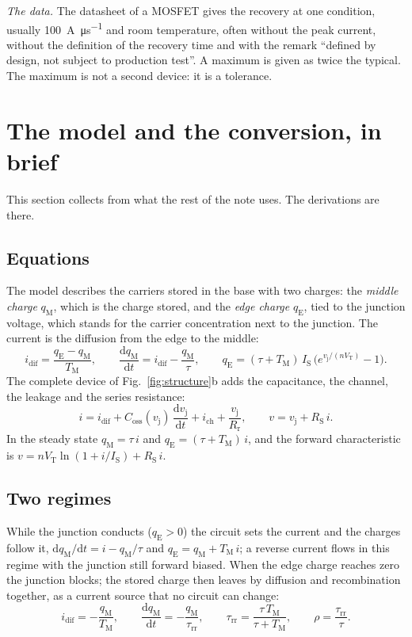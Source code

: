 \documentclass[10pt,a4paper]{scrartcl}
\newcommand{\Coss}{C_\mathrm{oss}}
\newcommand{\taurr}{\tau_\mathrm{rr}}
\newcommand{\TM}{T_\mathrm{M}}
\newcommand{\qE}{q_\mathrm{E}}
\newcommand{\qM}{q_\mathrm{M}}
\newcommand{\idif}{i_\mathrm{dif}}
\newcommand{\ich}{i_\mathrm{ch}}
\newcommand{\vj}{v_\mathrm{j}}
\newcommand{\IS}{I_\mathrm{S}}
\newcommand{\RS}{R_\mathrm{S}}
\newcommand{\Rr}{R_\mathrm{r}}
\newcommand{\VT}{V_\mathrm{T}}
\newcommand{\diff}{\mathrm{d}}
\begin{document}
\emph{The data.} The datasheet of a MOSFET gives the recovery at one condition, usually \SI{100}{\ampere\per\micro\second} and room temperature, often without the peak current, without the definition of the recovery time and with the remark ``defined by design, not subject to production test''. A maximum is given as twice the typical. The maximum is not a second device: it is a tolerance.

\section{The model and the conversion, in brief}
\label{sec:model}
This section collects from \cite{lmnote} what the rest of the note uses. The derivations are there.

\subsection{Equations}
The model describes the carriers stored in the base with two charges: the \emph{middle charge} $\qM$, which is the charge stored, and the \emph{edge charge} $\qE$, tied to the junction voltage, which stands for the carrier concentration next to the junction. The current is the diffusion from the edge to the middle:
\begin{equation}
\idif = \frac{\qE - \qM}{\TM} , \qquad
\frac{\diff \qM}{\diff t} = \idif - \frac{\qM}{\tau} , \qquad
\qE = (\tau+\TM)\,\IS\,\bigl(e^{\vj/(n\VT)} - 1\bigr) .
\label{eq:model}
\end{equation}
The complete device of Fig.~\ref{fig:structure}b adds the capacitance, the channel, the leakage and the series resistance:
\begin{equation}
i = \idif + \Coss(\vj)\,\frac{\diff \vj}{\diff t} + \ich + \frac{\vj}{\Rr} , \qquad v = \vj + \RS\, i .
\label{eq:terminal}
\end{equation}
In the steady state $\qM = \tau\, i$ and $\qE = (\tau+\TM)\, i$, and the forward characteristic is $v = n\VT\ln(1+i/\IS) + \RS\,i$.

\subsection{Two regimes}
While the junction conducts ($\qE > 0$) the circuit sets the current and the charges follow it, $\diff\qM/\diff t = i - \qM/\tau$ and $\qE = \qM + \TM\,i$; a reverse current flows in this regime with the junction still forward biased. When the edge charge reaches zero the junction blocks; the stored charge then leaves by diffusion and recombination together, as a current source that no circuit can change:
\begin{equation}
\idif = -\frac{\qM}{\TM} , \qquad \frac{\diff\qM}{\diff t} = -\frac{\qM}{\taurr} , \qquad \taurr = \frac{\tau\,\TM}{\tau+\TM} , \qquad \rho = \frac{\taurr}{\tau} .
\label{eq:blocked}
\end{equation}
\end{document}
